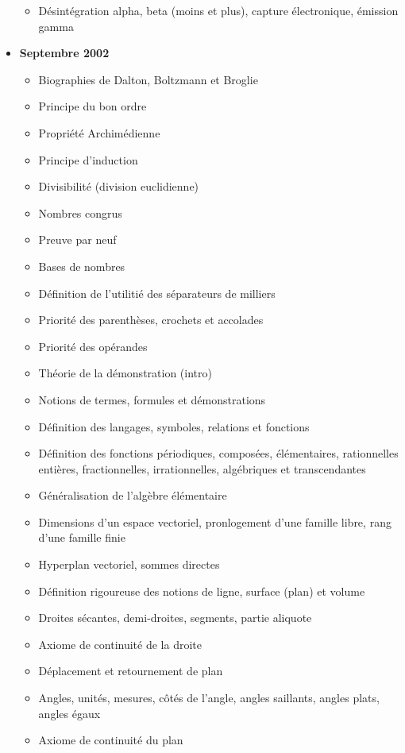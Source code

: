 \begin{itemize}
\begin{itemize}[noitemsep]
				\item Désintégration alpha, beta (moins et plus), capture électronique, émission gamma
			\end{itemize}
		\item \textbf{Septembre 2002}	
			\begin{itemize}[noitemsep]
				\item Biographies de Dalton, Boltzmann et Broglie
				\item Principe du bon ordre
				\item Propriété Archimédienne
				\item Principe d'induction
				\item Divisibilité (division euclidienne)
				\item Nombres congrus
				\item Preuve par neuf
				\item Bases de nombres
				\item Définition de l'utilitié des séparateurs de milliers
				\item Priorité des parenthèses, crochets et accolades
				\item Priorité des opérandes
				\item Théorie de la démonstration (intro)
				\item Notions de termes, formules et démonstrations
				\item Définition des langages, symboles, relations et fonctions
				\item Définition des fonctions périodiques, composées, élémentaires, rationnelles entières, fractionnelles, irrationnelles, algébriques et transcendantes
				\item Généralisation de l'algèbre élémentaire
				\item Dimensions d'un espace vectoriel, pronlogement d'une famille libre, rang d'une famille finie
				\item Hyperplan vectoriel, sommes directes
				\item Définition rigoureuse des notions de ligne, surface (plan) et volume
				\item Droites sécantes, demi-droites, segments, partie aliquote
				\item Axiome de continuité de la droite
				\item Déplacement et retournement de plan
				\item Angles, unités, mesures, côtés de l'angle, angles saillants, angles plats, angles égaux
				\item Axiome de continuité du plan

\end{itemize}
\end{itemize}
